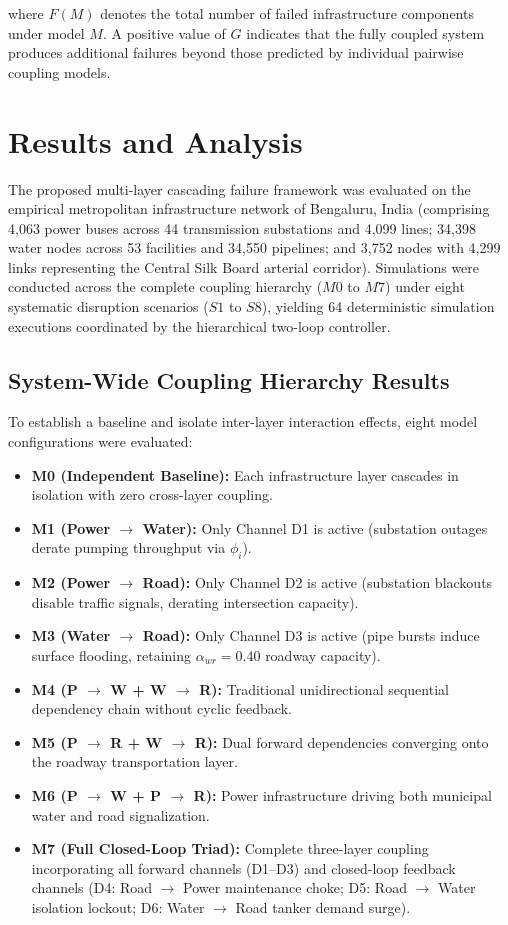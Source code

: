 \documentclass[oneside]{ieeeaccess}
\begin{document}
where $F(M)$ denotes the total number of failed infrastructure components under model $M$. A positive value of $G$ indicates that the fully coupled system produces additional failures beyond those predicted by individual pairwise coupling models.

\section{Results and Analysis}
\label{sec:results}

The proposed multi-layer cascading failure framework was evaluated on the empirical metropolitan infrastructure network of Bengaluru, India (comprising 4,063 power buses across 44 transmission substations and 4,099 lines; 34,398 water nodes across 53 facilities and 34,550 pipelines; and 3,752 nodes with 4,299 links representing the Central Silk Board arterial corridor). Simulations were conducted across the complete coupling hierarchy ($M0$ to $M7$) under eight systematic disruption scenarios ($S1$ to $S8$), yielding 64 deterministic simulation executions coordinated by the hierarchical two-loop controller.

\subsection{System-Wide Coupling Hierarchy Results}

To establish a baseline and isolate inter-layer interaction effects, eight model configurations were evaluated:
\begin{itemize}
    \item \textbf{M0 (Independent Baseline):} Each infrastructure layer cascades in isolation with zero cross-layer coupling.
    \item \textbf{M1 (Power $\rightarrow$ Water):} Only Channel D1 is active (substation outages derate pumping throughput via $\phi_i$).
    \item \textbf{M2 (Power $\rightarrow$ Road):} Only Channel D2 is active (substation blackouts disable traffic signals, derating intersection capacity).
    \item \textbf{M3 (Water $\rightarrow$ Road):} Only Channel D3 is active (pipe bursts induce surface flooding, retaining $\alpha_{wr}=0.40$ roadway capacity).
    \item \textbf{M4 (P $\rightarrow$ W + W $\rightarrow$ R):} Traditional unidirectional sequential dependency chain without cyclic feedback.
    \item \textbf{M5 (P $\rightarrow$ R + W $\rightarrow$ R):} Dual forward dependencies converging onto the roadway transportation layer.
    \item \textbf{M6 (P $\rightarrow$ W + P $\rightarrow$ R):} Power infrastructure driving both municipal water and road signalization.
    \item \textbf{M7 (Full Closed-Loop Triad):} Complete three-layer coupling incorporating all forward channels (D1--D3) and closed-loop feedback channels (D4: Road $\rightarrow$ Power maintenance choke; D5: Road $\rightarrow$ Water isolation lockout; D6: Water $\rightarrow$ Road tanker demand surge).
\end{itemize}
\end{document}
